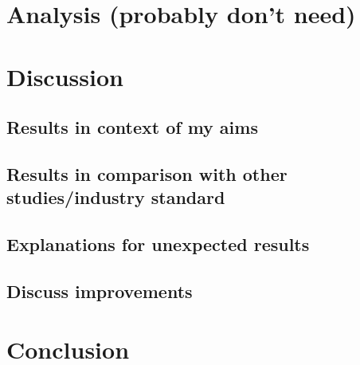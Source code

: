 \documentclass[aps,pra,a4paper,nofootinbib,onecolumn,tightenlines,longbibliography,12pt,amsfonts,amssymb,amsmath,floatfix]{revtex4-2} %
\begin{document}
  
\section{Analysis (probably don't need)} %
\label{sec:Analysis}


\section{Discussion} %
\label{sec:Discussion}


  \subsection{Results in context of my aims} %
  \label{sub:Results in context of my aims}

  \subsection{Results in comparison with other studies/industry standard} %
  \label{sub:Results in comparison with other studies/industry standard}
  
  \subsection{Explanations for unexpected results} %
  \label{sub:Explanations for unexpected results}
  
  \subsection{Discuss improvements} %
  \label{sub:Discuss improvement}



\section{Conclusion} %
\label{sec:Conclusion}





\end{document}
